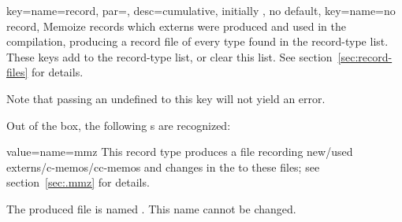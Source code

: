 \documentclass[a4paper,11pt]{article}
\begin{document}
\begin{doc}{
    key={name=record, par=,
      desc={cumulative, initially , no default}},
    key={name=no record},
  }
  Memoize records which externs were produced and used in the compilation,
  producing a record file of every type found in the record-type list.  These
  keys add  to the record-type list, or clear this list.  See
  section~\ref{sec:record-files} for details.

  Note that passing an undefined  to this key will not yield
  an error.

  Out of the box, the following s are recognized:
  \begin{doc}{value={name=mmz}}
    This record type produces a \dmmz file recording new/used
    externs/c-memos/cc-memos and changes in the  to these
    files; see section~\ref{sec:.mmz} for details.

    The produced file is named . This name cannot be changed.


\end{doc}
\end{doc}
\end{document}
